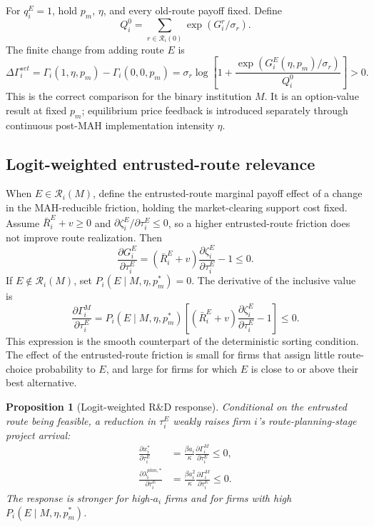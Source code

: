 \documentclass[12pt]{article}
\newtheorem{proposition}{Proposition}
\newcommand{\1}{\mathbf{1}}
\newcommand{\calR}{\mathcal{R}}
\begin{document}
For $q_i^E=1$, hold $p_m$, $\eta$, and every old-route payoff fixed. Define
\[
    Q_i^0=\sum_{r\in\calR_i(0)}\exp(G_i^r/\sigma_r).
\]
The finite change from adding route $E$ is
\begin{equation}
    \Delta\Gamma_i^{set}
    =\Gamma_i(1,\eta,p_m)-\Gamma_i(0,0,p_m)
    =\sigma_r\log\left[
      1+\frac{\exp(G_i^E(\eta,p_m)/\sigma_r)}{Q_i^0}
    \right]>0.
    \label{eq:set_expansion_appendix}
\end{equation}
This is the correct comparison for the binary institution $M$. It is an option-value result at fixed $p_m$; equilibrium price feedback is introduced separately through continuous post-MAH implementation intensity $\eta$.

\subsection{Logit-weighted entrusted-route relevance}

When $E\in\calR_i(M)$, define the entrusted-route marginal payoff effect of a change in the MAH-reducible friction, holding the market-clearing support cost fixed. Assume $\bar R_i^E+v\ge0$ and $\partial\zeta_i^E/\partial\tau_i^E\le0$, so a higher entrusted-route friction does not improve route realization. Then
\begin{equation}
    \frac{\partial G_i^E}{\partial \tau_i^E}
    =
    \left(\bar R_i^E+v\right)
    \frac{\partial \zeta_i^E}{\partial \tau_i^E}
    -1
    \le0.
    \label{eq:dGEdtau}
\end{equation}
If $E\notin\calR_i(M)$, set $P_i(E\mid M,\eta,p_m^*)=0$. The derivative of the inclusive value is
\begin{equation}
    \frac{\partial \Gamma_i^M}{\partial \tau_i^E}
    =
    P_i(E\mid M,\eta,p_m^*)
    \left[
    \left(\bar R_i^E+v\right)
    \frac{\partial \zeta_i^E}{\partial \tau_i^E}
    -1
    \right]
    \le0.
    \label{eq:dGammadTau_logit}
\end{equation}
This expression is the smooth counterpart of the deterministic sorting condition. The effect of the entrusted-route friction is small for firms that assign little route-choice probability to $E$, and large for firms for which $E$ is close to or above their best alternative.

\begin{proposition}[Logit-weighted R\&D response]
\label{prop:logit_weighted_response}
Conditional on the entrusted route being feasible, a reduction in $\tau_i^E$ weakly raises firm $i$'s route-planning-stage project arrival:
\begin{align}
    \frac{\partial x_i^*}{\partial \tau_i^E}
    &=
    \frac{\beta a_i}{\kappa}
    \frac{\partial \Gamma_i^M}{\partial \tau_i^E}
    \le0,
    \label{eq:dxdtau_logit}\\
    \frac{\partial \lambda_i^{plan,*}}{\partial \tau_i^E}
    &=
    \frac{\beta a_i^2}{\kappa}
    \frac{\partial \Gamma_i^M}{\partial \tau_i^E}
    \le0.
    \label{eq:dLambdadtau_logit}
\end{align}
The response is stronger for high-$a_i$ firms and for firms with high $P_i(E\mid M,\eta,p_m^*)$.
\end{proposition}
\end{document}
